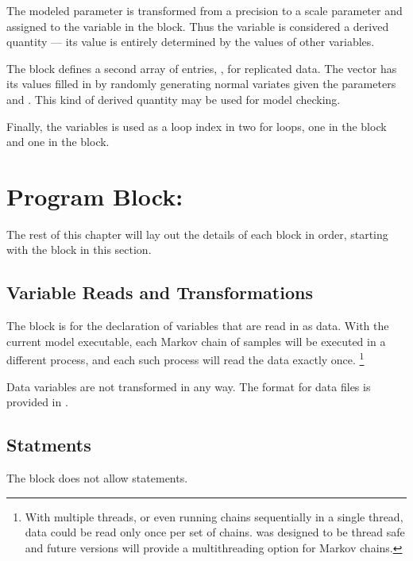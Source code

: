 The modeled parameter  is transformed from a precision to
a scale parameter and assigned to the variable  in the
 block. Thus the variable 
is considered a derived quantity --- its value is entirely determined
by the values of other variables.  

The  block defines a second array of 
entries, , for replicated data.  The vector 
has its values filled in by randomly generating normal variates given
the parameters  and .  This kind of derived
quantity may be used for model checking.

Finally, the variables  is used as a loop index in two for
loops, one in the  block and one in the  block.


\section{Program Block: }

The rest of this chapter will lay out the details of each block in
order, starting with the  block in this section.

\subsection{Variable Reads and Transformations}

The  block is for the declaration of variables that are
read in as data.  With the current model executable, each Markov chain
of samples will be executed in a different process, and each such
process will read the data exactly once.%
%
\footnote{With multiple threads, or even running chains sequentially
  in a single thread, data could be read only once per set of
  chains. \Stan was designed to be thread safe and future versions 
  will provide a multithreading option for Markov chains.\label{thread.footnote}}
%

Data variables are not transformed in any way.  The format for data
files is provided in .

\subsection{Statments}

The  block does not allow statements.

